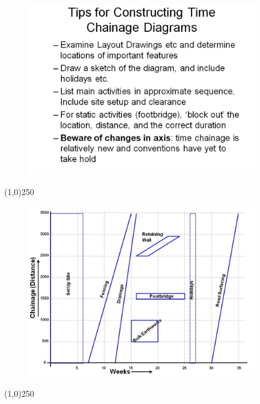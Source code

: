 \begin{frame}
\begin{figure}
	\centering
		\includegraphics[width = 10.0cm]{oldnotes/Slide311.jpg}
\end{figure}
\end{frame}
\begin{center}\line(1,0){250}\end{center}




\begin{frame}
\begin{figure}
	\centering
		\includegraphics[width = 10.0cm]{oldnotes/Slide312.jpg}
\end{figure}
\end{frame}
\begin{center}\line(1,0){250}\end{center}





